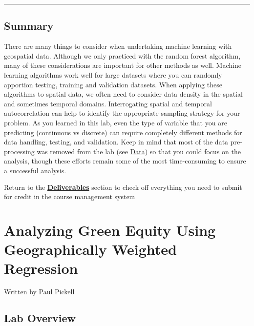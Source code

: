 \documentclass[
]{book}
\begin{document}
\begin{center}\rule{0.5\linewidth}{0.5pt}\end{center}

\hypertarget{summary-3}{%
\section*{Summary}\label{summary-3}}

There are many things to consider when undertaking machine learning with geospatial data. Although we only practiced with the random forest algorithm, many of these considerations are important for other methods as well. Machine learning algorithms work well for large datasets where you can randomly apportion testing, training and validation datasets. When applying these algorithms to spatial data, we often need to consider data density in the spatial and sometimes temporal domains. Interrogating spatial and temporal autocorrelation can help to identify the appropriate sampling strategy for your problem. As you learned in this lab, even the type of variable that you are predicting (continuous vs discrete) can require completely different methods for data handling, testing, and validation. Keep in mind that most of the data pre-processing was removed from the lab (see \protect\hyperlink{lab4-data}{Data}) so that you could focus on the analysis, though these efforts remain some of the most time-consuming to ensure a successful analysis.

Return to the \protect\hyperlink{lab4-deliverables}{\textbf{Deliverables}} section to check off everything you need to submit for credit in the course management system

\hypertarget{geographically-weighted-regression}{%
\chapter{Analyzing Green Equity Using Geographically Weighted Regression}\label{geographically-weighted-regression}}

Written by
Paul Pickell

\hypertarget{lab-overview-4}{%
\section*{Lab Overview}\label{lab-overview-4}}
\end{document}
